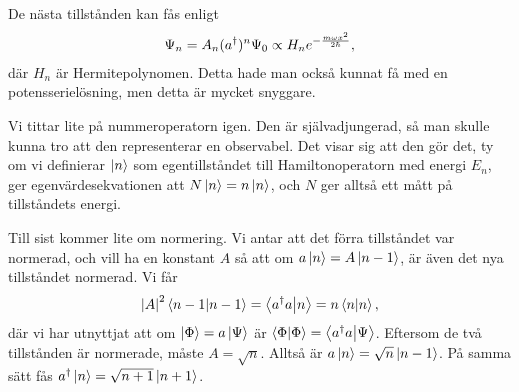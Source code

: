De nästa tillstånden kan fås enligt
\begin{align*}
	\Psi_{n} = A_{n}(a^{\dagger})^{n}\Psi_{0} \propto H_{n}e^{-\frac{m\omega x^{2}}{2\hbar}},
\end{align*}
där $H_{n}$ är Hermitepolynomen. Detta hade man också kunnat få med en potensserielösning, men detta är mycket snyggare.

Vi tittar lite på nummeroperatorn igen. Den är självadjungerad, så man skulle kunna tro att den representerar en observabel. Det visar sig att den gör det, ty om vi definierar $\ket{n}$ som egentillståndet till Hamiltonoperatorn med energi $E_{n}$, ger egenvärdesekvationen att $N\ket{n} = n\ket{n}$, och $N$ ger alltså ett mått på tillståndets energi.

Till sist kommer lite om normering. Vi antar att det förra tillståndet var normerad, och vill ha en konstant $A$ så att om $a\ket{n} = A\ket{n - 1}$, är även det nya tillståndet normerad. Vi får
\begin{align*}
	\abs{A}^{2}\braket{n - 1} = \braket{a^{\dagger}a}{n} = n\braket{n},
\end{align*}
där vi har utnyttjat att om $\ket{\Phi} = a\ket{\Psi}$ är $\braket{\Phi} = \braket{a^{\dagger}a}{\Psi}$. Eftersom de två tillstånden är normerade, måste $A = \sqrt{n}$. Alltså är $a\ket{n} = \sqrt{n}\ket{n - 1}$. På samma sätt fås $a^{\dagger}\ket{n} = \sqrt{n + 1}\ket{n + 1}$.